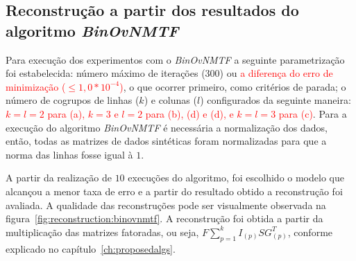 \documentclass[
    12pt,                %
    oneside,            %
    a4paper,            %
    english,            %
    brazil                %
    ]{abntex2ppgsi}
\begin{document}
\subsection{Reconstrução a partir dos resultados do algoritmo \textit{BinOvNMTF}}
\label{subsec:results-reconstruction-binovnmtf}


Para execução dos experimentos com o \textit{BinOvNMTF} a seguinte parametrização foi estabelecida: número máximo de iterações ($300$) ou \textcolor{red}{a diferença do erro de minimização ($\leq 1,0 * 10^{-4}$)}, o que ocorrer primeiro, como critérios de parada; o número de cogrupos de linhas ($k$) e colunas ($l$) configurados da seguinte maneira: \textcolor{red}{$k = l = 2$ para (a), $k = 3$ e $l = 2 $ para (b), (d) e (d), e $k = l = 3$ para (c)}. Para a execução do algoritmo \textit{BinOvNMTF} é necessária a normalização dos dados, então, todas as matrizes de dados sintéticas foram normalizadas para que a norma das linhas fosse igual à $1$. 

A partir da realização de $10$ execuções do algoritmo, foi escolhido o modelo que alcançou a menor taxa de erro e a partir do resultado obtido a reconstrução foi avaliada. A qualidade das reconstruções pode ser visualmente observada na figura~\ref{fig:reconstruction:binovnmtf}. A reconstrução foi obtida a partir da multiplicação das matrizes fatoradas, ou seja, $F \sum_{p=1}^{k} I_{(p)} S G_{(p)}^T$, conforme explicado no capítulo~\ref{ch:proposedalgs}.


\end{document}
